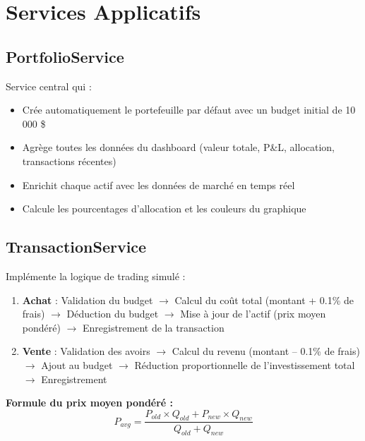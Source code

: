 \documentclass[12pt,a4paper]{article}
\begin{document}
\section{Services Applicatifs}

\subsection{PortfolioService}

Service central qui :
\begin{itemize}
    \item Crée automatiquement le portefeuille par défaut avec un budget initial de 10 000 \$
    \item Agrège toutes les données du dashboard (valeur totale, P\&L, allocation, transactions récentes)
    \item Enrichit chaque actif avec les données de marché en temps réel
    \item Calcule les pourcentages d'allocation et les couleurs du graphique
\end{itemize}

\subsection{TransactionService}

Implémente la logique de trading simulé :

\begin{techbox}
\begin{enumerate}
    \item \textbf{Achat} : Validation du budget $\rightarrow$ Calcul du coût total (montant + 0.1\% de frais) $\rightarrow$ Déduction du budget $\rightarrow$ Mise à jour de l'actif (prix moyen pondéré) $\rightarrow$ Enregistrement de la transaction
    \item \textbf{Vente} : Validation des avoirs $\rightarrow$ Calcul du revenu (montant -- 0.1\% de frais) $\rightarrow$ Ajout au budget $\rightarrow$ Réduction proportionnelle de l'investissement total $\rightarrow$ Enregistrement
\end{enumerate}
\end{techbox}

\textbf{Formule du prix moyen pondéré :}
\begin{equation}
    P_{avg} = \frac{P_{old} \times Q_{old} + P_{new} \times Q_{new}}{Q_{old} + Q_{new}}
\end{equation}
\end{document}
